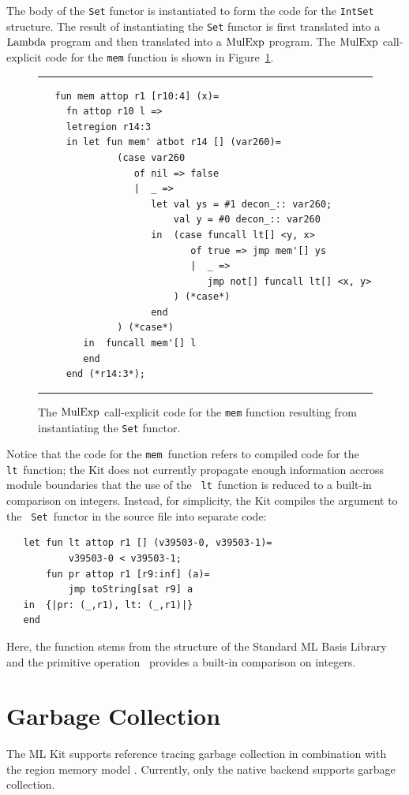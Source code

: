 \documentclass[12pt]{book}
\begin{document}
The body of the {\tt Set} functor is instantiated to form the code for
the {\tt IntSet} structure. The result of instantiating the {\tt Set}
functor is first translated into a $\hbox{\rm Lambda}$ program and then translated
into a $\hbox{\rm MulExp}$ program. The $\hbox{\rm MulExp}$ call-explicit code for the
{\tt mem} function is shown in Figure~\ref{set_inst_mulexp.fig}.
\begin{figure}[ht]
\hrule \medskip
\begin{verbatim}
   fun mem attop r1 [r10:4] (x)= 
     fn attop r10 l => 
     letregion r14:3 
     in let fun mem' atbot r14 [] (var260)= 
              (case var260 
                 of nil => false
                 |  _ => 
                    let val ys = #1 decon_:: var260; 
                        val y = #0 decon_:: var260
                    in  (case funcall lt[] <y, x> 
                           of true => jmp mem'[] ys
                           |  _ => 
                              jmp not[] funcall lt[] <x, y>
                        ) (*case*) 
                    end 
              ) (*case*) 
        in  funcall mem'[] l
        end  
     end (*r14:3*); 
\end{verbatim}
\caption{The $\hbox{\rm MulExp}$ call-explicit code for the {\tt mem} 
  function resulting from instantiating the {\tt Set} functor.}
\medskip \hrule
\label{set_inst_mulexp.fig}
\end{figure}

Notice that the code for the {\tt mem}~function refers to compiled
code for the {\tt lt}~function; the Kit does not currently propagate
enough information accross module boundaries that the use of the {\tt
  lt}~function is reduced to a built-in comparison on integers.
Instead, for simplicity, the Kit compiles the argument to the {\tt
  Set}~functor in the source file  into separate
code:
\begin{verbatim}
   let fun lt attop r1 [] (v39503-0, v39503-1)= 
           v39503-0 < v39503-1; 
       fun pr attop r1 [r9:inf] (a)= 
           jmp toString[sat r9] a
   in  {|pr: (_,r1), lt: (_,r1)|}
   end 
\end{verbatim}
Here, the  function stems from the 
structure of the Standard ML Basis Library and the primitive
operation~\boxml{<} provides a built-in comparison on integers.

\chapter{Garbage Collection}
\label{gc.chap}
The ML Kit supports reference tracing garbage collection in
combination with the region memory model \cite{hallenberg99}.
Currently, only the native backend supports garbage collection.
\end{document}

